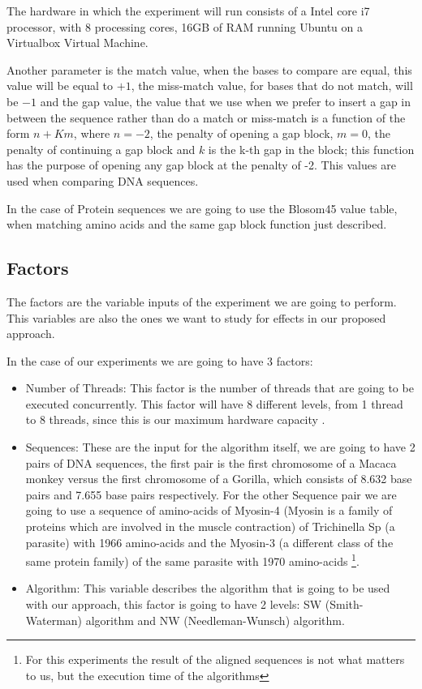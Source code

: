 \documentclass[journal]{IEEEtran}
\begin{document}
The hardware in which the experiment will run consists of a Intel core i7 processor, with 8 processing cores, 16GB of RAM running Ubuntu on a Virtualbox Virtual Machine.

Another parameter is the match value, when the bases to compare are equal, this value will be equal to $+1$, the miss-match value, for bases that do not match, will be $-1$ and the gap value, the value that we use when we prefer to insert a gap in between the sequence rather than do a match or miss-match is a function of the form $n + Km$, where $n = -2$, the penalty of opening a gap block, $m = 0$, the penalty of continuing a gap block and $k$ is the k-th gap in the block; this function has the purpose of opening any gap block at the penalty of -2. This values are used when comparing DNA sequences.

In the case of Protein sequences we are going to use the Blosom45 value table, when matching amino acids and the same gap block function just described.


\subsection{Factors}

The factors are the variable inputs of the experiment we are going to perform. This variables are also the ones we want to study for effects in our proposed approach. 

In the case of our experiments we are going to have 3 factors:

\begin{itemize}
    \item Number of Threads: This factor is the number of threads that are going to be executed concurrently. This factor will have 8 different levels, from 1 thread to 8 threads, since this is our maximum hardware capacity .
    \item Sequences: These are the input for the algorithm itself, we are going to have 2 pairs of DNA sequences, the first pair is the first chromosome of a Macaca monkey versus the first chromosome of a Gorilla, which consists of 8.632 base pairs and 7.655 base pairs respectively. For the other Sequence pair we are going to use a sequence of amino-acids of Myosin-4 (Myosin is a family of proteins which are involved in the muscle contraction) of Trichinella Sp (a parasite)  with 1966 amino-acids and the Myosin-3 (a different class of the same protein family) of the same parasite with 1970 amino-acids \footnote{For this experiments the result of the aligned sequences is not what matters to us, but the execution time of the algorithms}.
    \item Algorithm: This variable describes the algorithm that is going to be used with our approach, this factor is going to have 2 levels: SW (Smith-Waterman) algorithm and NW (Needleman-Wunsch) algorithm. 
\end{itemize}
\end{document}
